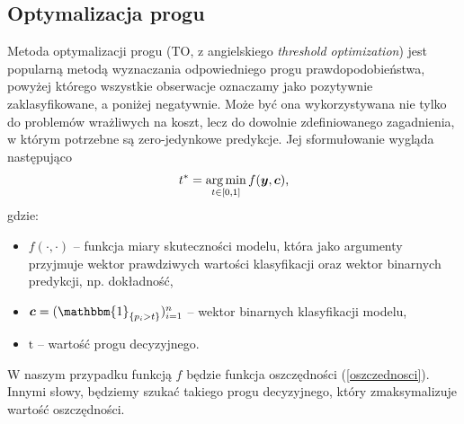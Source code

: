 \documentclass[inzynierska]{pwr_wmat_praca_dyplomowa}
\theoremstyle{plain}
\numberwithin{theorem}{chapter}
\theoremstyle{definition}
\numberwithin{theorem}{chapter}
\DeclareMathOperator*{\argmin}{arg\,min}
\begin{document}
\subsection{Optymalizacja progu}
Metoda optymalizacji progu (TO, z angielskiego \textit{threshold optimization}) jest popularną metodą wyznaczania odpowiedniego progu prawdopodobieństwa, powyżej którego wszystkie obserwacje oznaczamy jako pozytywnie zaklasyfikowane, a poniżej negatywnie. Może być ona wykorzystywana nie tylko do problemów wrażliwych na koszt, lecz do dowolnie zdefiniowanego zagadnienia, w którym potrzebne są zero-jedynkowe predykcje. Jej sformułowanie wygląda następująco
$$ t^{*} = \argmin_{t \in [0,1]} f(\ytrue, \boldsymbol{c}) \text{,} $$
gdzie:
\begin{itemize}
	\item $f(\cdot, \cdot) $ -- funkcja miary skuteczności modelu, która jako argumenty przyjmuje wektor prawdziwych wartości klasyfikacji oraz wektor binarnych predykcji, np. dokładność,
	\item $\boldsymbol{c} = (\mathbbm{1}_{\{p_i > t\}})_{i=1}^n $ -- wektor binarnych klasyfikacji modelu,
	\item $ \text{t} $ -- wartość progu decyzyjnego.
\end{itemize}{}
W naszym przypadku funkcją $f$ będzie funkcja oszczędności (\ref{oszczednosci}). Innymi słowy, będziemy szukać takiego progu decyzyjnego, który zmaksymalizuje wartość oszczędności.
\end{document}
